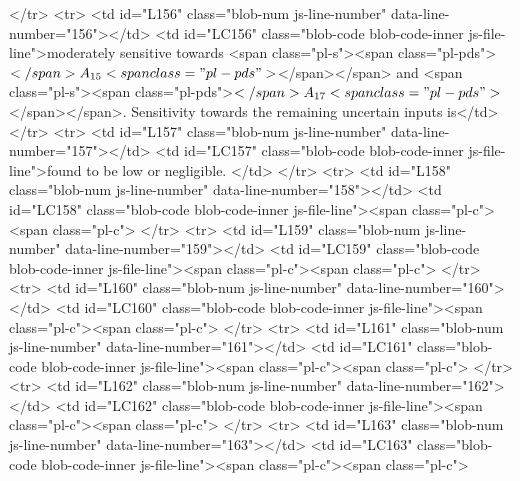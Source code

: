       </tr>
      <tr>
        <td id="L156" class="blob-num js-line-number" data-line-number="156"></td>
        <td id="LC156" class="blob-code blob-code-inner js-file-line">moderately sensitive towards <span class="pl-s"><span class="pl-pds">$</span>A_{15}<span class="pl-pds">$</span></span> and <span class="pl-s"><span class="pl-pds">$</span>A_{17}<span class="pl-pds">$</span></span>. Sensitivity towards the remaining uncertain inputs is</td>
      </tr>
      <tr>
        <td id="L157" class="blob-num js-line-number" data-line-number="157"></td>
        <td id="LC157" class="blob-code blob-code-inner js-file-line">found to be low or negligible. </td>
      </tr>
      <tr>
        <td id="L158" class="blob-num js-line-number" data-line-number="158"></td>
        <td id="LC158" class="blob-code blob-code-inner js-file-line"><span class="pl-c"><span class="pl-c">%
      </tr>
      <tr>
        <td id="L159" class="blob-num js-line-number" data-line-number="159"></td>
        <td id="LC159" class="blob-code blob-code-inner js-file-line"><span class="pl-c"><span class="pl-c">%
      </tr>
      <tr>
        <td id="L160" class="blob-num js-line-number" data-line-number="160"></td>
        <td id="LC160" class="blob-code blob-code-inner js-file-line"><span class="pl-c"><span class="pl-c">%
      </tr>
      <tr>
        <td id="L161" class="blob-num js-line-number" data-line-number="161"></td>
        <td id="LC161" class="blob-code blob-code-inner js-file-line"><span class="pl-c"><span class="pl-c">%
      </tr>
      <tr>
        <td id="L162" class="blob-num js-line-number" data-line-number="162"></td>
        <td id="LC162" class="blob-code blob-code-inner js-file-line"><span class="pl-c"><span class="pl-c">%
      </tr>
      <tr>
        <td id="L163" class="blob-num js-line-number" data-line-number="163"></td>
        <td id="LC163" class="blob-code blob-code-inner js-file-line"><span class="pl-c"><span class="pl-c">%
